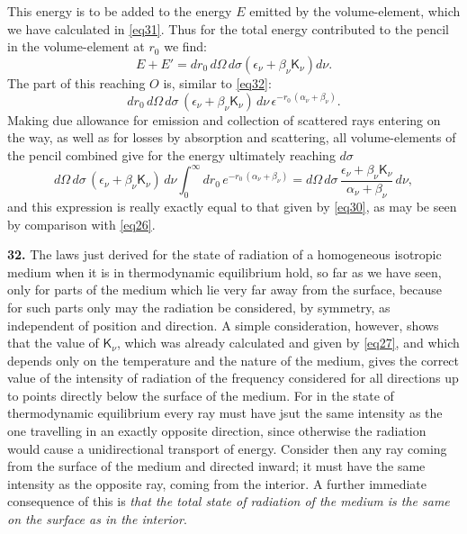 \documentclass[12pt,oneside]{book}
\begin{document}
This energy is to be added to the energy $E$ emitted by the volume-element, which we have calculated in \eqref{eq31}. Thus for the total energy contributed to the pencil in the volume-element at $r_0$ we find: 
$$E+E'=dr_0\, d\Omega\, d\sigma(\epsilon_\nu+\beta_\nu\mathsf{K}_\nu)d\nu.$$ 
The part of this reaching $O$ is, similar to \eqref{eq32}:
$$dr_0\, d\Omega\, d\sigma\, (\epsilon_\nu+\beta_\nu\mathsf{K}_\nu)\, d\nu\, \epsilon^{-r_0\, (\alpha_\nu+\beta_\nu)}.$$
Making due allowance for emission and collection of scattered rays entering on the way, as well as for losses by absorption and scattering, all volume-elements of the pencil combined give for the energy ultimately reaching $d\sigma$ 
$$d\Omega\, d\sigma\, (\epsilon_\nu+\beta_\nu\mathsf{K}_\nu)\, d\nu\int_0^\infty dr_0\, e^{-r_0\, (\alpha_\nu+\beta_\nu)}=d\Omega\, d\sigma\, \frac{\epsilon_\nu+\beta_\nu\mathsf{K}_\nu}{\alpha_\nu+\beta_\nu}\, d\nu,$$ 
and this expression is really exactly equal to that given by \eqref{eq30}, as may be seen by comparison with \eqref{eq26}. \par 

\textbf{32.} The laws just derived for the state of radiation of a homogeneous isotropic medium when it is in thermodynamic equilibrium hold, so far as we have seen, only for parts of the medium which lie very far away from the surface, because for such parts only may the radiation be considered, by symmetry, as independent of position and direction. A simple consideration, however, shows that the value of $\mathsf{K}_\nu$, which was already calculated and given by \eqref{eq27}, and which depends only on the temperature and the nature of the medium, gives the correct value of the intensity of radiation of the frequency considered for all directions up to points directly below the surface of the medium. For in the state of thermodynamic equilibrium every ray must have jsut the same intensity as the one travelling in an exactly opposite direction, since otherwise the radiation would cause a unidirectional transport of energy. Consider then any ray coming from the surface of the medium and directed inward; it must have the same intensity as the opposite ray, coming from the interior. A further immediate consequence of this is \textit{that the total state of radiation of the medium is the same on the surface as in the interior}. \par 
\end{document}
